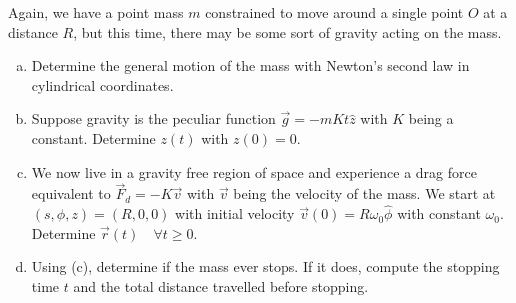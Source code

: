 \documentclass{article}
\begin{document}
\begin{prb}
Again, we have a point mass $m$ constrained to move around a single
point $O$ at a distance $R$, but this time, there may be some sort of
gravity acting on the mass.
\begin{enumerate}[(a)]
\item Determine the general motion of the mass with Newton's second law
in cylindrical coordinates.
\item Suppose gravity is the peculiar function $\vec{g} = -mKt\hat{z}$
with $K$ being a constant. Determine $z(t)$ with $z(0) = 0$.
\item We now live in a gravity free region of space and experience a
drag force equivalent to $\vec{F}_d = -K \vec{v}$ with $\vec{v}$ being
the velocity of the mass. We start at $(s, \phi, z) = (R, 0, 0)$ with
initial velocity $\vec{v}(0) = R \omega_0 \hat{\phi}$ with constant
$\omega_0$. Determine $\vec{r}(t) \quad \forall t \geq 0$.
\item Using (c), determine if the mass ever stops. If it does, compute
the stopping time $t$ and the total distance travelled before stopping.
\end{enumerate}
\end{prb}
\end{document}
